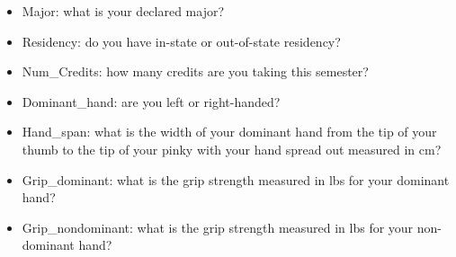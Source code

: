 \documentclass[
]{report}
\providecommand{\tightlist}{%
  \setlength{\itemsep}{0pt}\setlength{\parskip}{0pt}}
\begin{document}
\begin{itemize}
\tightlist
\item
  Major: what is your declared major?
\end{itemize}

\vspace{0.2in}

\begin{itemize}
\tightlist
\item
  Residency: do you have in-state or out-of-state residency?
\end{itemize}

\vspace{0.2in}

\begin{itemize}
\tightlist
\item
  Num\_Credits: how many credits are you taking this semester?
\end{itemize}

\vspace{0.2in}

\begin{itemize}
\tightlist
\item
  Dominant\_hand: are you left or right-handed?
\end{itemize}

\vspace{0.2in}

\begin{itemize}
\tightlist
\item
  Hand\_span: what is the width of your dominant hand from the tip of your thumb to the tip of your pinky with your hand spread out measured in cm?
\end{itemize}

\vspace{0.2in}

\begin{itemize}
\tightlist
\item
  Grip\_dominant: what is the grip strength measured in lbs for your dominant hand?
\end{itemize}

\vspace{0.2in}

\begin{itemize}
\tightlist
\item
  Grip\_nondominant: what is the grip strength measured in lbs for your non-dominant hand?
\end{itemize}

\vspace{0.2in}
\end{document}
